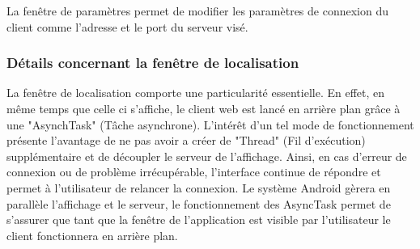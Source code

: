 	 La fenêtre de paramètres permet de modifier les paramètres de connexion du client comme l'adresse et le port du serveur visé.
		
	
\subsubsection{Détails concernant la fenêtre de localisation}

	La fenêtre de localisation comporte une particularité essentielle. En effet, en même temps que celle ci s'affiche, le client web est lancé en arrière plan grâce à une "AsynchTask" (Tâche asynchrone). L'intérêt d'un tel mode de fonctionnement présente l'avantage de ne pas avoir a créer de "Thread" (Fil d'exécution) supplémentaire et de découpler le serveur de l'affichage. Ainsi, en cas d'erreur de connexion ou de problème irrécupérable, l'interface continue de répondre et permet à l'utilisateur de relancer la connexion. Le système Android gèrera en parallèle l'affichage et le serveur, le fonctionnement des AsyncTask permet de s'assurer que tant que la fenêtre de l'application est visible par l'utilisateur le client fonctionnera en arrière plan.
	
	 

	

